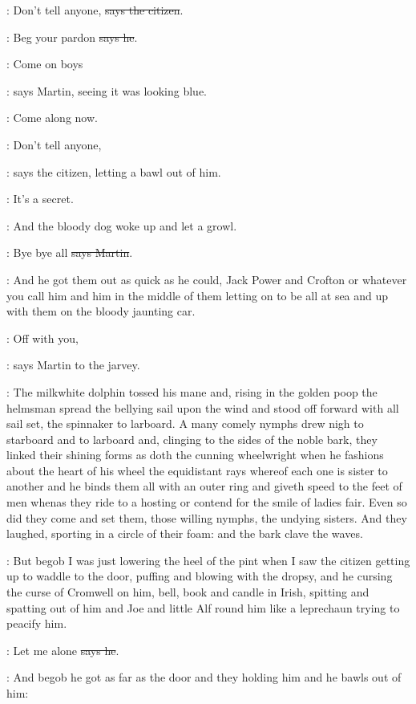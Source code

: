 \citizen:
Don't tell anyone, \sout{says the citizen}.

\Bloom:
Beg your pardon \sout{says he}.

\cunningham:
Come on boys

\Nq:
says Martin, seeing it was looking blue.

\cunningham:
Come along now.

\citizen:
Don't tell anyone,

\Nq:
says the citizen, letting a bawl out of him.

\citizen:
It's a secret.

\Nq:
And the bloody dog woke up and let a growl.

\cunningham:
Bye bye all \sout{says Martin}.

\Nq:
And he got them out as quick as he could, Jack Power and Crofton or
whatever you call him and him in the middle of them letting on to be all
at sea
and up with them on the bloody jaunting car.

\cunningham:
Off with you,

\Nq:
says Martin to the jarvey.

:
The milkwhite dolphin tossed his mane and, rising in the golden poop
the helmsman spread the bellying sail upon the wind and stood off forward
with all sail set, the spinnaker to larboard. A many comely nymphs drew
nigh to starboard and to larboard and, clinging to the sides of the noble
bark, they linked their shining forms as doth the cunning wheelwright when
he fashions about the heart of his wheel the equidistant rays whereof each
one is sister to another and he binds them all with an outer ring and
giveth speed to the feet of men whenas they ride to a hosting or contend
for the smile of ladies fair.
Even so did they come and set them, those
willing nymphs, the undying sisters. And they laughed, sporting in a
circle of their foam: and the bark clave the waves.

\Nq:
But begob I was just lowering the heel of the pint when I saw the
citizen getting up to waddle to the door, puffing and blowing with the
dropsy, and he cursing the curse of Cromwell on him, bell, book and candle
in Irish, spitting and spatting out of him and Joe and little Alf round
him like a leprechaun trying to peacify him.

\citizen:
Let me alone \sout{says he}.

\Nq:
And begob he got as far as the door and they holding him and he
bawls out of him:%

